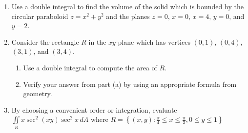 \documentclass[12pt]{article}
\newif\ifans
\begin{document}
\begin{enumerate}
\begin{enumerate}
\end{enumerate}

\item Use a double integral to find the volume of the solid which is bounded by the circular paraboloid $z=x^2+y^2$ and the planes $z=0$, $x=0$, $x=4$, $y=0$, and $y=2$.

\ifans{\fbox{$\frac{160}{3}$}} \fi

\item Consider the rectangle $R$ in the $xy$-plane which has vertices $(0,1)$, $(0,4)$, $(3,1)$, and $(3,4)$.

\begin{enumerate}

\item Use a double integral to compute the area of $R$.

\ifans{\fbox{$A=\int_0^3\int_1^4 1 \,dy\,dx=\int_1^4\int_0^3 1 \,dx\,dy=9$}} \fi

\item Verify your answer from part (a) by using an appropriate formula from geometry.

\ifans{\fbox{$A=bh=3\cdot3=9$}} \fi

\end{enumerate}

\item By choosing a convenient order or integration, evaluate $\iint \limits_{R} x\sec^2{(xy)}\sec^2{x} \,dA$ where $R=\left\{(x,y) : \frac{\pi}{4}\leq x \leq \frac{\pi}{3}, 0 \leq y \leq 1\right\}$

\ifans{\fbox{1}} \fi

\end{enumerate}
\end{document}
